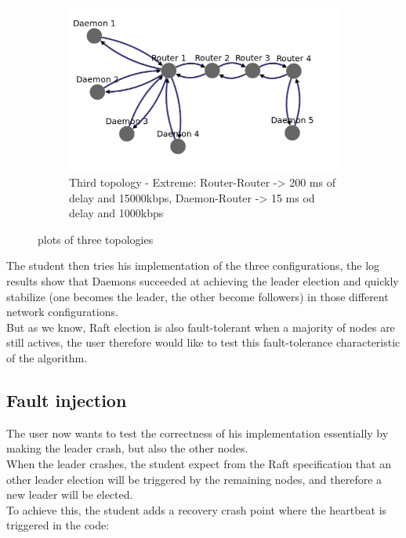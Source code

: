 \documentclass{eplmastersthesis}
\begin{document}
\begin{figure}[H]
\begin{subfigure}{0.6\textwidth}
            \includegraphics[width=1.0\linewidth]{figures/user_case/raft_topo_3.png}
            \caption{Third topology - Extreme: Router-Router -> 200 ms of delay and 15000kbps, Daemon-Router -> 15 ms od delay and 1000kbps}
            \label{fig:topo3}
          \end{subfigure}
          \caption{plots of three topologies}
          \label{fig:topologies}
        \end{figure}

        The student then tries his implementation of the three configurations,
        the log results show that Daemons succeeded at achieving the leader
        election and quickly stabilize (one becomes the leader, the other
        become followers) in those different network configurations.\\
        But as we know, Raft election is also fault-tolerant when a majority of
        nodes are still actives, the user therefore would like to test this
        fault-tolerance characteristic of the algorithm.

      \subsection{Fault injection}

        The user now wants to test the correctness of his implementation
        essentially by making the leader crash, but also the other nodes.\\
        When the leader crashes, the student expect from the Raft specification
        that an other leader election will be triggered by the remaining
        nodes, and therefore a new leader will be elected.\\
        To achieve this, the student adds a recovery crash point where the
        heartbeat is triggered in the code:
\end{document}
